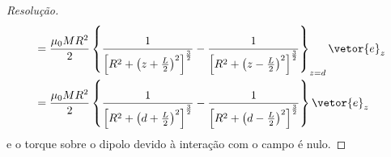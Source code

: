 \begin{proof}[Resolução]
\begin{align*}
                  &= \frac{\mu_0 M R^2}{2}\left\{\frac{1}{\left[R^2 + \left(z + \frac{L}{2}\right)^2\right]^{\frac32}} - \frac{1}{\left[R^2 + \left(z - \frac{L}{2}\right)^2\right]^{\frac32}}\right\}_{z = d}\vetor{e}_z\\
                  &= \frac{\mu_0 M R^2}{2}\left\{\frac{1}{\left[R^2 + \left(d + \frac{L}{2}\right)^2\right]^{\frac32}} - \frac{1}{\left[R^2 + \left(d - \frac{L}{2}\right)^2\right]^{\frac32}}\right\}\vetor{e}_z
    \end{align*}
    e o torque sobre o dipolo devido à interação com o campo é nulo.
\end{proof}
